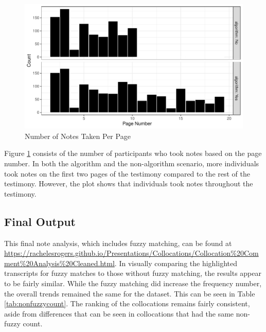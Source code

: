 \documentclass[print]{nuthesis}
\begin{document}
\begin{figure}

{\centering \includegraphics[width=\linewidth]{thesis_files/figure-latex/notecount-1} 

}

\caption{Number of Notes Taken Per Page}\label{fig:notecount}
\end{figure}

Figure \ref{fig:notecount} consists of the number of participants who took notes based on the page number.
In both the algorithm and the non-algorithm scenario, more individuals took notes on the first two pages of the testimony compared to the rest of the testimony.
However, the plot shows that individuals took notes throughout the testimony.

\hypertarget{final-output}{%
\subsection{Final Output}\label{final-output}}

This final note analysis, which includes fuzzy matching, can be found at \url{https://rachelesrogers.github.io/Presentations/Collocations/Collocation\%20Comment\%20Analysis\%20Cleaned.html}.
In visually comparing the highlighted transcripts for fuzzy matches to those without fuzzy matching, the results appear to be fairly similar.
While the fuzzy matching did increase the frequency number, the overall trends remained the same for the dataset.
This can be seen in Table \ref{tab:nonfuzzycount}.
The ranking of the collocations remains fairly consistent, aside from differences that can be seen in collocations that had the same non-fuzzy count.
\end{document}
